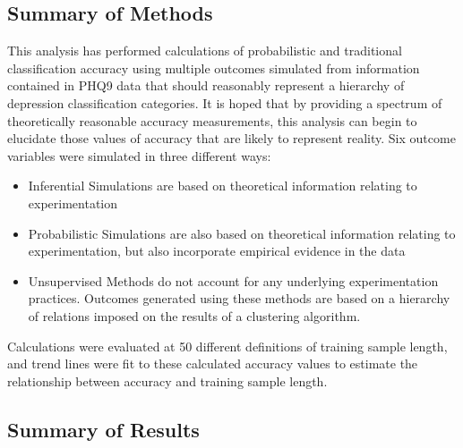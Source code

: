 \documentclass[12pt,]{article}
\providecommand{\tightlist}{%
  \setlength{\itemsep}{0pt}\setlength{\parskip}{0pt}}
\begin{document}
\hypertarget{summary-of-methods}{%
\subsection{Summary of Methods}\label{summary-of-methods}}

This analysis has performed calculations of probabilistic and
traditional classification accuracy using multiple outcomes simulated
from information contained in PHQ9 data that should reasonably represent
a hierarchy of depression classification categories. It is hoped that by
providing a spectrum of theoretically reasonable accuracy measurements,
this analysis can begin to elucidate those values of accuracy that are
likely to represent reality. Six outcome variables were simulated in
three different ways:

\begin{itemize}
\tightlist
\item
  Inferential Simulations are based on theoretical information relating
  to experimentation
\item
  Probabilistic Simulations are also based on theoretical information
  relating to experimentation, but also incorporate empirical evidence
  in the data
\item
  Unsupervised Methods do not account for any underlying experimentation
  practices. Outcomes generated using these methods are based on a
  hierarchy of relations imposed on the results of a clustering
  algorithm.
\end{itemize}

Calculations were evaluated at 50 different definitions of training
sample length, and trend lines were fit to these calculated accuracy
values to estimate the relationship between accuracy and training sample
length.

\hypertarget{summary-of-results}{%
\subsection{Summary of Results}\label{summary-of-results}}
\end{document}
